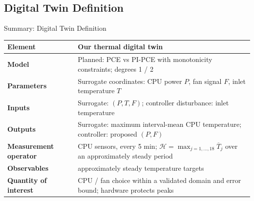 \subsection{Digital Twin Definition}

\begin{frame}{Summary: Digital Twin Definition}
  {\normalfont\small
  \renewcommand{\arraystretch}{1.35}
  \setlength{\tabcolsep}{4pt}
  \begin{tabular}{@{}p{}p{}@{}}
    \toprule
    \textbf{Element} & \textbf{Our thermal digital twin}\\
    \midrule
    \textbf{Model} & \mdseries
      Planned: PCE vs PI-PCE with monotonicity constraints; degrees 1 / 2\\
    \midrule
    \textbf{Parameters} & \mdseries
      Surrogate coordinates: CPU power $P$, fan signal $F$, inlet temperature $T$\\
    \midrule
    \textbf{Inputs} & \mdseries
      Surrogate: $(P,T,F)$; controller disturbance: inlet temperature\\
    \midrule
    \textbf{Outputs} & \mdseries
      Surrogate: maximum interval-mean CPU temperature; controller: proposed $(P,F)$\\
    \midrule
    \textbf{Measurement operator} & \mdseries
      18 CPU sensors, every 5 min; $\mathcal H=\max_{j=1,\ldots,18}\overline{T}_j$ over an approximately steady period\\
    \midrule
    \textbf{Observables} & \mdseries
      19 approximately steady temperature targets\\
    \midrule
    \textbf{Quantity of interest} & \mdseries
      CPU / fan choice within a validated domain and error bound; hardware protects peaks\\
    \bottomrule
  \end{tabular}
  }
\end{frame}
